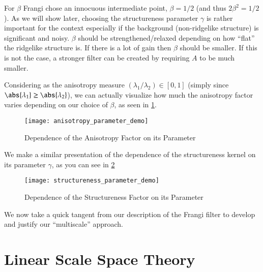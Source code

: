     For $\beta$ Frangi chose an innocuous intermediate point, $\beta=1/2$ (and thus $2\beta^2 = 1/2$).
    As we will show later, choosing the structureness parameter $\gamma$ is rather important for the context especially if the background (non-ridgelike structure) is significant and noisy. $\beta$ should be strengthened/relaxed depending on how ``flat'' the ridgelike structure is. If there is a lot of gain then $\beta$ should be smaller. If this is not the case, a stronger filter can be created by requiring $A$ to be much smaller.
    
    Considering as the anisotropy measure $(\lambda_1 / \lambda_2) \in [0,1]$ (simply since $\abs{\lambda_1} \ge \abs{\lambda_2}$), we can actually visualize how much the 
    anisotropy factor varies depending on our choice of $\beta$, as seen in \cref{fig:anisotropy-parameter-demo}.
    
    \begin{figure}
      \texttt{[image: anisotropy\_parameter\_demo]}
      \caption{Dependence of the Anisotropy Factor on its Parameter}
      \label{fig:anisotropy-parameter-demo}
    \end{figure}

We make a similar presentation of the dependence of the structureness kernel on its parameter $\gamma$, as you can see in
\cref{fig:structureness-parameter-demo}
    \begin{figure}
    \texttt{[image: structureness\_parameter\_demo]}
    \caption{Dependence of the Structureness Factor on its Parameter}
    \label{fig:structureness-parameter-demo}
  \end{figure}





	We now take a quick tangent from our description of the Frangi filter to develop and justify our ``multiscale'' approach.
	
        
    \section{Linear Scale Space Theory} \label{sec:scale-space-theory}
    
